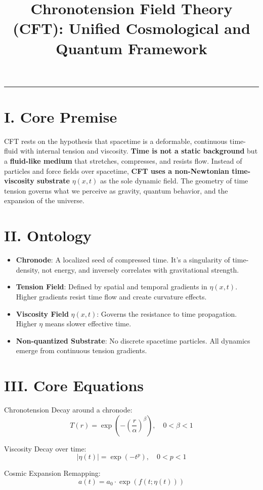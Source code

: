 \documentclass[12pt]{article}
\title{\textbf{Chronotension Field Theory (CFT): Unified Cosmological and Quantum Framework}}
\author{}
\date{}
\begin{document}
\maketitle
\hrule
\vspace{1em}

\section*{I. Core Premise}
CFT rests on the hypothesis that spacetime is a deformable, continuous time-fluid with internal tension and viscosity. \textbf{Time is not a static background} but a \textbf{fluid-like medium} that stretches, compresses, and resists flow. Instead of particles and force fields over spacetime, \textbf{CFT uses a non-Newtonian time-viscosity substrate} $\eta(x,t)$ as the sole dynamic field. The geometry of time tension governs what we perceive as gravity, quantum behavior, and the expansion of the universe.

\section*{II. Ontology}
\begin{itemize}
  \item \textbf{Chronode}: A localized seed of compressed time. It’s a singularity of time-density, not energy, and inversely correlates with gravitational strength.
  \item \textbf{Tension Field}: Defined by spatial and temporal gradients in $\eta(x,t)$. Higher gradients resist time flow and create curvature effects.
  \item \textbf{Viscosity Field} $\eta(x,t)$: Governs the resistance to time propagation. Higher $\eta$ means slower effective time.
  \item \textbf{Non-quantized Substrate}: No discrete spacetime particles. All dynamics emerge from continuous tension gradients.
\end{itemize}

\section*{III. Core Equations}
Chronotension Decay around a chronode:
\[
T(r) = \exp\left( - \left( \frac{r}{\alpha} \right)^\beta \right), \quad 0 < \beta < 1
\]

Viscosity Decay over time:
\[
|\eta(t)| = \exp(-t^p), \quad 0 < p < 1
\]

Cosmic Expansion Remapping:
\[
a(t) = a_0 \cdot \exp(f(t; \eta(t)))
\]
\end{document}
